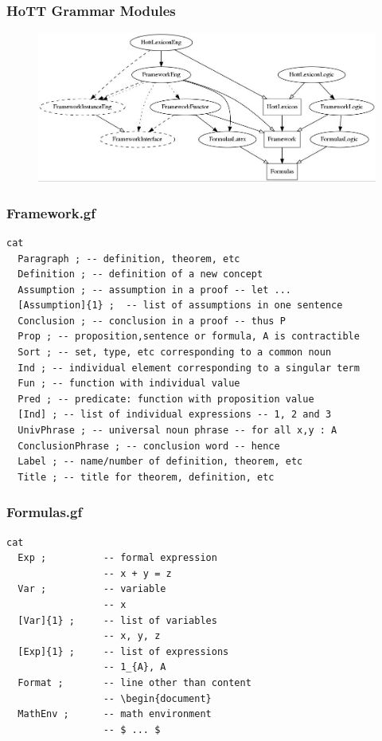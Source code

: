 \documentclass[9pt]{beamer}
\begin{document}
\begin{frame}
\frametitle{HoTT Grammar Modules}

\begin{figure}
\hspace*{-3mm}%
   \includegraphics[width= \paperwidth]{testdep3.jpg}
\end{figure}
\end{frame}

\begin{frame}[fragile]
\frametitle{Framework.gf}
\begin{verbatim}
cat
  Paragraph ; -- definition, theorem, etc
  Definition ; -- definition of a new concept
  Assumption ; -- assumption in a proof -- let ...
  [Assumption]{1} ;  -- list of assumptions in one sentence
  Conclusion ; -- conclusion in a proof -- thus P
  Prop ; -- proposition,sentence or formula, A is contractible
  Sort ; -- set, type, etc corresponding to a common noun
  Ind ; -- individual element corresponding to a singular term
  Fun ; -- function with individual value
  Pred ; -- predicate: function with proposition value
  [Ind] ; -- list of individual expressions -- 1, 2 and 3
  UnivPhrase ; -- universal noun phrase -- for all x,y : A
  ConclusionPhrase ; -- conclusion word -- hence
  Label ; -- name/number of definition, theorem, etc
  Title ; -- title for theorem, definition, etc
\end{verbatim}
\end{frame}
\begin{frame}[fragile]

\frametitle{Formulas.gf}
\begin{verbatim}
cat
  Exp ;          -- formal expression             
                 -- x + y = z
  Var ;          -- variable
                 -- x
  [Var]{1} ;     -- list of variables             
                 -- x, y, z
  [Exp]{1} ;     -- list of expressions           
                 -- 1_{A}, A
  Format ;       -- line other than content       
                 -- \begin{document}
  MathEnv ;      -- math environment              
                 -- $ ... $
\end{verbatim}
\end{frame}
\end{document}
